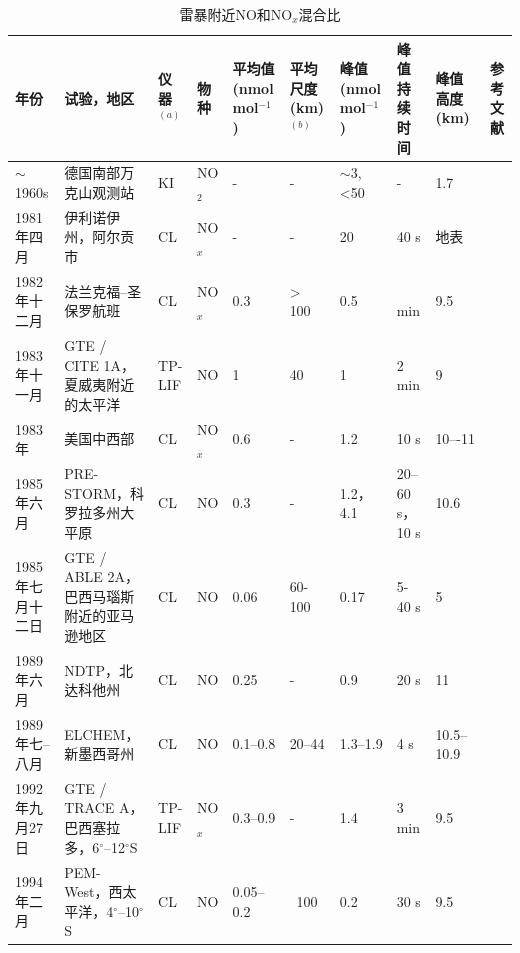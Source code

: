 {
\centering
\scriptsize
\begin{longtable}
{|p{3em}|p{5.2em}|p{3.3em}|p{2em}|p{5.5em}|p{4em}|p{5.5em}|p{4em}|p{4em}|p{4.4em}|}
\caption{雷暴附近NO和NO$_x$混合比}
\label{table:NO/NOx} \\
\hline
年份 & 试验，地区  & 仪器$^{(a)}$  & 物种 & 平均值 (nmol mol$^{−1}$) &
平均尺度 (km) $^{(b)}$  &  峰值 \newline(nmol mol$^{−1}$)  &  峰值 \newline 持续时间  & 峰值高度(km) &   参考文献 \\ \hline
$\sim$1960s & 德国南部万克山观测站              & KI     & NO$_2$ & -   &  -    &  $\sim$3, <50  & -    & 1.7   &  \citet{Reiter.1970} \\ \hline
1981年四月   & 伊利诺伊州，阿尔贡市              & CL     & NO$_x$ & -   &  -    &  20            & 40 s  & 地表  &  \citet{Drapcho.1983} \\ \hline
1982年十二月 & 法兰克福–圣保罗航班               & CL     & NO$_x$ & 0.3 & > 100 &  0.5           & ~ min &  9.5 & \citet{Dickerson.1984} \\ \hline
1983年十一月 & GTE / CITE 1A，夏威夷附近的太平洋 & TP-LIF & NO  & 1    & 40    &   1            & 2 min & 9    & \citet{Chameides.1987,Davis.1987} \\ \hline
1983年      & 美国中西部                       & CL     & NO$_x$ & 0.6 & -     & 1.2            & 10 s  & 10–-11 & \citet{Dickerson.1987} \\ \hline
1985年六月   & PRE-STORM，科罗拉多州大平原       & CL     & NO  & 0.3 & -     & 1.2，4.1       & 20--60 s， 10 s &  10.6  &  \citet{Luke.1992} \\ \hline
1985年七月十二日  & GTE / ABLE 2A，巴西马瑙斯附近的亚马逊地区 & CL  & NO  & 0.06 & 60-100 & 0.17  & 5-40 s & 5  & \citet{Torres.1988} \\ \hline
1989年六月   & NDTP，北达科他州                 & CL     & NO  & 0.25  & -   & 0.9            & 20 s   &  11  & \citet{Poulida.1996} \\ \hline
1989年七--八月 &  ELCHEM，新墨西哥州            & CL      & NO  & 0.1--0.8 & 20--44  & 1.3--1.9 & 4 s  & 10.5--10.9   & \citet{Ridley.1996} \\ \hline
1992年九月27日  & GTE / TRACE A，巴西塞拉多，6$^{\circ}$--12$^{\circ}$S & TP-LIF & NO$_x$ & 0.3--0.9 & - &  1.4 & 3 min  & 9.5 & \citet{Pickering.1996} \\ \hline
1994年二月    & PEM-West，西太平洋，4$^{\circ}$--10$^{\circ}$S & CL  &  NO  & 0.05--0.2 &~100 & 0.2 & 30 s  &  9.5 & \citet{Kawakami.1997} \\ \hline

\end{longtable}}
